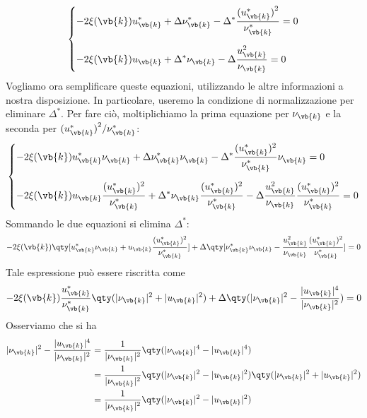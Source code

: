 \begin{equation*}
   \begin{dcases}
      -2\xi(\vb{k}) u_{\vb{k}}^*
      + \Delta \nu_{\vb{k}}^*
      - \Delta^* \dfrac{{(u_{\vb{k}}^*)}^2}{\nu_{\vb{k}}^*}
      =0
      \\[0.2cm]
      -2\xi(\vb{k}) u_{\vb{k}}
      + \Delta^* \nu_{\vb{k}}
      - \Delta \dfrac{u_{\vb{k}}^2}{\nu_{\vb{k}}}
      =0
   \end{dcases}
\end{equation*}
Vogliamo ora semplificare queste equazioni, utilizzando le altre informazioni a nostra disposizione. In particolare, useremo la condizione di normalizzazione per eliminare $\Delta^*$. Per fare ciò, moltiplichiamo la prima equazione per $\nu_{\vb{k}}$ e la seconda per ${(u_{\vb{k}}^*)}^2/\nu_{\vb{k}}^*$:
\begin{equation*}
   \begin{dcases}
      -2\xi(\vb{k}) u_{\vb{k}}^* \nu^{\hphantom{*}}_{\vb{k}}
      + \Delta \nu_{\vb{k}}^* \nu^{\hphantom{*}}_{\vb{k}}
      - \Delta^* \dfrac{(u_{\vb{k}}^*)^2}{\nu_{\vb{k}}^*} \nu^{\hphantom{*}}_{\vb{k}}
      =0
      \\[0.2cm]
      -2\xi(\vb{k}) u_{\vb{k}} \dfrac{(u_{\vb{k}}^*)^2}{\nu_{\vb{k}}^*}
      + \Delta^* \nu_{\vb{k}} \dfrac{(u_{\vb{k}}^*)^2}{\nu_{\vb{k}}^*}
      - \Delta \dfrac{u_{\vb{k}}^2}{\nu_{\vb{k}}}\dfrac{(u_{\vb{k}}^*)^2}{\nu_{\vb{k}}^*}
      =0
   \end{dcases}
\end{equation*}
Sommando le due equazioni si elimina $\Delta^*$:
\begin{equation*}
   -2\xi(\vb{k}) \qty[ u_{\vb{k}}^* \nu_{\vb{k}}
   + u_{\vb{k}} \frac{(u_{\vb{k}}^*)^2}{\nu_{\vb{k}}^*} ]
   + \Delta \qty[ \nu_{\vb{k}}^* \nu_{\vb{k}}
   - \frac{u_{\vb{k}}^2}{\nu_{\vb{k}}} \frac{(u_{\vb{k}}^*)^2}{\nu_{\vb{k}}^*} ]
   =0
\end{equation*}
Tale espressione può essere riscritta come
\begin{equation*}
   -2\xi(\vb{k}) \frac{u_{\vb{k}}^*}{\nu_{\vb{k}}^*}\qty( |\nu_{\vb{k}}|^2 + |u_{\vb{k}}|^2 )
   + \Delta \qty( |\nu_{\vb{k}}|^2 - \frac{|u_{\vb{k}}|^4}{|\nu_{\vb{k}}|^2} )
   =0
\end{equation*}
Osserviamo che si ha
\begin{equation*}
   \begin{split}
      |\nu_{\vb{k}}|^2 - \frac{|u_{\vb{k}}|^4}{|\nu_{\vb{k}}|^2}
      & =\frac{1}{|\nu_{\vb{k}}|^2} \qty( |\nu_{\vb{k}}|^4 - |u_{\vb{k}}|^4 )
      \\
      & =\frac{1}{|\nu_{\vb{k}}|^2} \qty( |\nu_{\vb{k}}|^2 - |u_{\vb{k}}|^2 ) \qty( |\nu_{\vb{k}}|^2 + |u_{\vb{k}}|^2 )
      \\
      & =\frac{1}{|\nu_{\vb{k}}|^2} \qty( |\nu_{\vb{k}}|^2 - |u_{\vb{k}}|^2 )
   \end{split}
\end{equation*}

